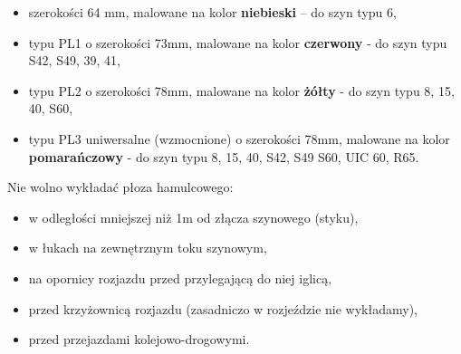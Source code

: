 \begin{itemize}
	\item szerokości 64 mm, malowane na kolor \textbf{niebieski} – do szyn typu 6,
	\item typu PL1 o szerokości 73mm, malowane na kolor \textbf{czerwony} - do szyn typu S42, S49, 39, 41,
	\item typu PL2 o szerokości 78mm, malowane na kolor \textbf{żółty} - do szyn typu 8, 15, 40, S60,
	\item typu PL3 uniwersalne (wzmocnione) o szerokości 78mm, malowane na kolor \textbf{pomarańczowy} - do szyn typu 8, 15, 40, S42, S49 S60, UIC
	60, R65.
\end{itemize}

Nie wolno wykładać płoza hamulcowego:
\begin{itemize}
	\item w odległości mniejszej niż 1m od złącza szynowego (styku),
	\item w łukach na zewnętrznym toku szynowym,
	\item na opornicy rozjazdu przed przylegającą do niej iglicą,
	\item przed krzyżownicą rozjazdu (zasadniczo w rozjeździe nie wykładamy),
	\item przed przejazdami kolejowo-drogowymi.
\end{itemize} 